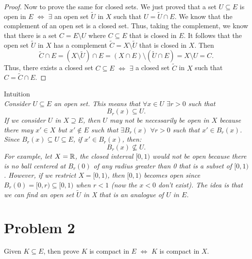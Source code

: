 \documentclass[a4paper]{article}
\begin{document}
\begin{proof}
Now to prove the same for closed sets. We just proved that a set $U \subseteq E$ is open in $E$ $\iff $ $\exists $ an open set $\tilde{U}$ in  $X$ such that $U = \tilde{U} \cap E$. We know that the complement of an open set is a closed set. Thus, taking the complement, we know that there is a set  $C = E \setminus U$ where $C \subseteq E$ that is closed in  $E$. It follows that the open set $\tilde{U}$ in  $X$ has a complement $\tilde{C} = X \setminus \tilde{U}$ that is closed in $X$. Then 
 \[
   \tilde{C} \cap E = (X \setminus \tilde{U}) \cap E = (X \cap E) \setminus (\tilde{U} \cap E) = X \setminus U = C
.\] 
Thus, there exists a closed set $C \subseteq E$ $\iff$ $\exists $ a closed set $\tilde{C}$ in  $X$ such that  $C = \tilde{C} \cap E$.  
\end{proof}

\begin{note}{Intuition}\\
\textit{Consider $U \subseteq E$ an open set. This means that $\forall x \in U$  $\exists r > 0$ such that 
\[
B_r(x) \subseteq U
.\] 
If we consider $U$ in  $X \supseteq E$, then  $U$ may not be necessarily be open in  $X$ because there may
 $x' \in X$ but  $x' \not\in E$ such that $\exists B_r(x)$ $\forall r > 0$ such that $x' \in B_r(x)$. Since $B_r(x) \subseteq U \subseteq E$,
 if $x' \in B_r(x)$, then:
 \[
  B_r(x) \not\subseteq U
 .\] 
 For example, let $X = \mathbb{R}$, the closed interval $[0,1)$ would not be open because there is no ball centered at
 $B_r(0)$ of any radius greater than 0 that is a subset of $[0,1)$. However, if we restrict $X = [0,1)$, then
$[0,1)$ becomes open since $B_r(0)=[0,r) \subseteq [0,1)$ when  $r < 1$ (now the  $x < 0$ don't exist). 
The idea is that we can find an open set $\tilde{U}$ in X that is an analogue of  $U$ in  $E$.}
\end{note}

\section{Problem 2}
Given $K \subseteq E$, then prove $K$ is compact in $E$ $\iff$ $K$ is compact in $X$. 
\end{document}
